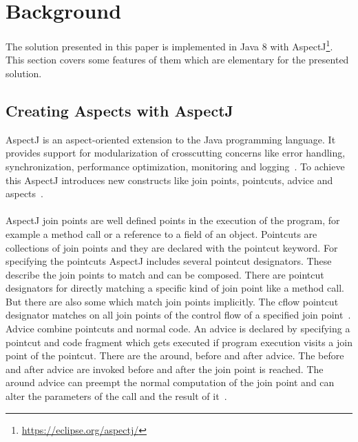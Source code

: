\documentclass[runningheads,a4paper]{llncs}
\begin{document}
\section{Background}\label{sec:background}
The solution presented in this paper is implemented in Java 8 with AspectJ\footnote{\url{https://eclipse.org/aspectj/}}.
This section covers some features of them which are elementary for the presented solution.

\subsection{Creating Aspects with AspectJ}\label{sub:aspectj}
AspectJ is an aspect-oriented extension to the Java programming language.
It provides support for modularization of crosscutting concerns like error handling, synchronization, performance optimization, monitoring and logging~\cite{aspectjWebsite}.
To achieve this AspectJ introduces new constructs like join points, pointcuts, advice and aspects~\cite{kiczales2001aspectJ}.\\
\\
AspectJ join points are well defined points in the execution of the program, for example a method call or a reference to a field of an object.
Pointcuts are collections of join points and they are declared with the pointcut keyword. For specifying the pointcuts AspectJ includes several pointcut designators.
These describe the join points to match and can be composed. There are pointcut designators for directly matching a specific kind of join point like a method call.
But there are also some which match join points implicitly. The cflow pointcut designator matches on all join points of the control flow of a specified join point~\cite{kiczales2001aspectJ}.
\\
Advice combine pointcuts and normal code. An advice is declared by specifying a pointcut and code fragment which gets executed if program execution visits a join point of the pointcut.
There are the around, before and after advice. The before and after advice are invoked before and after the join point is reached.
The around advice can preempt the normal computation of the join point and can alter the parameters of the call and the result of it~\cite{kiczales2001aspectJ}.
\end{document}

